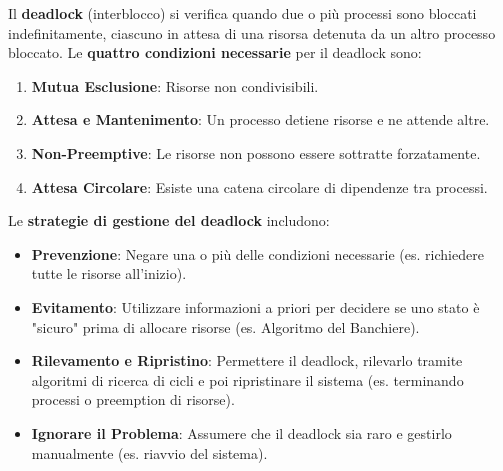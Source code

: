 Il \textbf{deadlock} (interblocco) si verifica quando due o più processi sono bloccati indefinitamente, ciascuno in attesa di una risorsa detenuta da un altro processo bloccato. Le \textbf{quattro condizioni necessarie} per il deadlock sono:
\begin{enumerate}
    \item \textbf{Mutua Esclusione}: Risorse non condivisibili.
    \item \textbf{Attesa e Mantenimento}: Un processo detiene risorse e ne attende altre.
    \item \textbf{Non-Preemptive}: Le risorse non possono essere sottratte forzatamente.
    \item \textbf{Attesa Circolare}: Esiste una catena circolare di dipendenze tra processi.
\end{enumerate}
Le \textbf{strategie di gestione del deadlock} includono:
\begin{itemize}
    \item \textbf{Prevenzione}: Negare una o più delle condizioni necessarie (es. richiedere tutte le risorse all'inizio).
    \item \textbf{Evitamento}: Utilizzare informazioni a priori per decidere se uno stato è "sicuro" prima di allocare risorse (es. Algoritmo del Banchiere).
    \item \textbf{Rilevamento e Ripristino}: Permettere il deadlock, rilevarlo tramite algoritmi di ricerca di cicli e poi ripristinare il sistema (es. terminando processi o preemption di risorse).
    \item \textbf{Ignorare il Problema}: Assumere che il deadlock sia raro e gestirlo manualmente (es. riavvio del sistema).
\end{itemize}